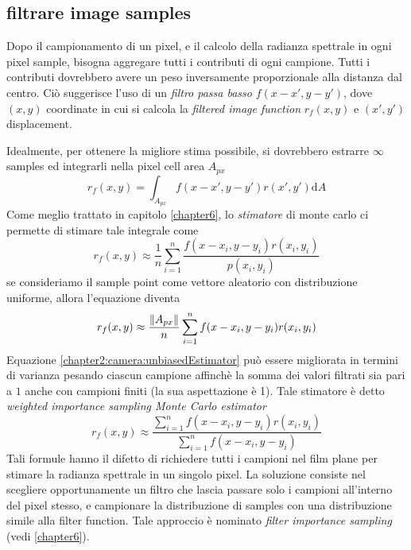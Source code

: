 \subsection{filtrare image samples}
Dopo il campionamento di un pixel, e il calcolo della radianza spettrale in ogni pixel sample, bisogna aggregare tutti i contributi di ogni campione.
Tutti i contributi dovrebbero avere un peso inversamente proporzionale alla distanza dal centro. Ci\`o suggerisce l'uso di un 
\textit{filtro passa basso} $f(x-x',y-y')$, dove $(x,y)$ coordinate in cui si calcola la \textit{filtered image function} 
$r_f(x,y)$ e $(x',y')$ displacement.\par
Idealmente, per ottenere la migliore stima possibile, si dovrebbero estrarre $\infty$ samples ed integrarli nella pixel cell area $A_{px}$
\begin{equation}
	r_f(x,y) = \int_{A_{px}} f(x-x', y-y')r(x',y') \mathrm{d}A
\end{equation}
Come meglio trattato in capitolo \ref{chapter6}, lo \textit{stimatore} di monte carlo ci permette di stimare tale integrale come
\begin{equation}
	r_f(x,y) \approx \frac{1}{n}\sum_{i=1}^n \frac{f(x-x_i, y-y_i)r(x_i, y_i)}{p(x_i, y_i)}
\end{equation}
se consideriamo il sample point come vettore aleatorio con distribuzione uniforme, allora l'equazione diventa
\begin{equation}\label{chapter2:camera:unbiasedEstimator}
	r_f(x,y) \approx \frac{\norm{A_{px}}}{n}\sum_{i=1}^n f(x-x_i, y-y_i)r(x_i, y_i)
\end{equation}
Equazione \ref{chapter2:camera:unbiasedEstimator} pu\`o essere migliorata in termini di varianza pesando ciascun campione affinch\`e la somma dei 
valori filtrati sia pari a $1$ anche con campioni finiti (la sua aspettazione \`e 1). Tale stimatore \`e detto \textit{weighted importance sampling
Monte Carlo estimator}
\begin{equation}\label{chapter2:camera:weightEstimatorAll}
	r_f(x,y) \approx \frac{\sum_{i=1}^n f(x-x_i,y-y_i)r(x_i,y_i)}{\sum_{i=1}^n f(x-x_i,y-y_i)}
\end{equation}
Tali formule hanno il difetto di richiedere tutti i campioni nel film plane per stimare la radianza spettrale in un singolo pixel. La soluzione consiste
nel scegliere opportunamente un filtro che lascia passare solo i campioni all'interno del pixel stesso, e campionare la distribuzione di samples con
una distribuzione simile alla filter function. Tale approccio \`e nominato \textit{filter importance sampling} (vedi \ref{chapter6}).
